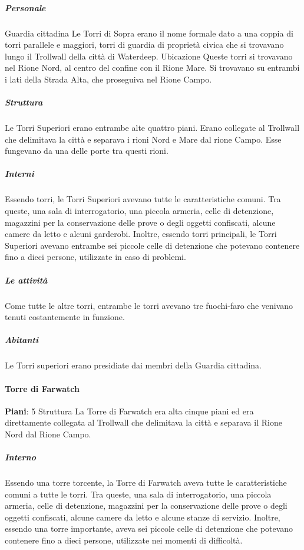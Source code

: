 \documentclass{article}
\begin{document}
                      \subparagraph{Personale}
Guardia cittadina
Le Torri di Sopra erano il nome formale dato a una coppia di torri parallele e maggiori, torri di guardia di proprietà civica che si trovavano lungo il Trollwall della città di Waterdeep.
Ubicazione
Queste torri si trovavano nel Rione Nord, al centro del confine con il Rione Mare. Si trovavano su entrambi i lati della Strada Alta, che proseguiva nel Rione Campo.

                      \subparagraph{Struttura}
Le Torri Superiori erano entrambe alte quattro piani. Erano collegate al Trollwall che delimitava la città e separava i rioni Nord e Mare dal rione Campo. Esse fungevano da una delle porte tra questi rioni.

                      \subparagraph{Interni}
Essendo torri, le Torri Superiori avevano tutte le caratteristiche comuni. Tra queste, una sala di interrogatorio, una piccola armeria, celle di detenzione, magazzini per la conservazione delle prove o degli oggetti confiscati, alcune camere da letto e alcuni garderobi. Inoltre, essendo torri principali, le Torri Superiori avevano entrambe sei piccole celle di detenzione che potevano contenere fino a dieci persone, utilizzate in caso di problemi.

                      \subparagraph{Le attività}
Come tutte le altre torri, entrambe le torri avevano tre fuochi-faro che venivano tenuti costantemente in funzione.

                      \subparagraph{Abitanti}
Le Torri superiori erano presidiate dai membri della Guardia cittadina.


                  \paragraph{Torre di Farwatch}
                  \textbf{Piani}: 5
                          Struttura
                          La Torre di Farwatch era alta cinque piani ed era direttamente collegata al Trollwall che delimitava la città e separava il Rione Nord dal Rione Campo.

                                                \subparagraph{Interno}
                          Essendo una torre torcente, la Torre di Farwatch aveva tutte le caratteristiche comuni a tutte le torri. Tra queste, una sala di interrogatorio, una piccola armeria, celle di detenzione, magazzini per la conservazione delle prove o degli oggetti confiscati, alcune camere da letto e alcune stanze di servizio. Inoltre, essendo una torre importante, aveva sei piccole celle di detenzione che potevano contenere fino a dieci persone, utilizzate nei momenti di difficoltà.
\end{document}
